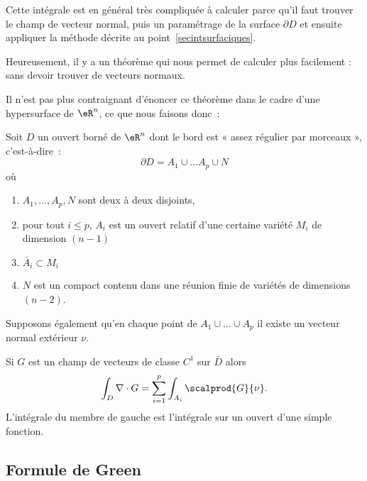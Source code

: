 Cette intégrale est en général très compliquée à calculer parce qu'il faut trouver le champ de vecteur normal, puis un paramétrage de la surface \( \partial D\) et ensuite appliquer la méthode décrite au point~\ref{secintsurfaciques}.

Heureusement, il y a un théorème qui nous permet de calculer plus facilement : sans devoir trouver de vecteurs normaux.

Il n'est pas plus contraignant d'énoncer ce théorème dans le cadre d'une hypersurface de \( \eR^n\), ce que nous faisons donc~:
\begin{theorem}
	Soit \( D\) un ouvert borné de \( \eR^n\) dont le bord est « assez régulier par morceaux », c'est-à-dire~:
	\begin{equation}
		\partial D = A_1 \cup \ldots A_p \cup N
	\end{equation}
	où
	\begin{enumerate}
		\item \( A_1, \ldots, A_p, N\) sont deux à deux disjoints,
		\item pour tout \( i \leq p\), \( A_i\) est un ouvert relatif d'une certaine variété \( M_i\) de dimension \( (n-1)\)
		\item \( \bar A_i \subset M_i\)
		\item \( N\) est un compact contenu dans une réunion finie de variétés de dimensions \( (n-2)\).
	\end{enumerate}
	Supposons également qu'en chaque point de \( A_1 \cup \ldots \cup A_p\) il existe un vecteur normal extérieur \( \nu\).

	Si \( G\) est un champ de vecteurs de classe \( C^1\) sur \( \bar D\) alors
	\begin{equation}
		\int_D \nabla\cdot G = \sum_{i=1}^p \int_{A_i} \scalprod{G}{\nu}.
	\end{equation}
	L'intégrale du membre de gauche est l'intégrale sur un ouvert d'une simple fonction.
\end{theorem}

\subsection{Formule de Green}


